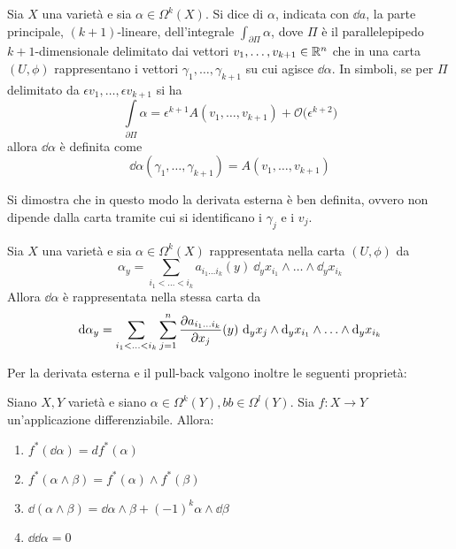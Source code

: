 \begin{definition}
  Sia $X$ una varietà e sia $\alpha \in \Omega^k(X)$. Si dice  di $\alpha$, indicata con $\dd{a}$, la parte principale, $(k+1)$-lineare, dell'integrale $\int_{\partial \Pi} \alpha$, dove $\Pi$ è il parallelepipedo $k+1$-dimensionale delimitato dai vettori $v_1, \ldots, v_{k+1} \in \mathbb{R}^{n}$ che in una carta $(U, \phi)$ rappresentano i vettori $\gamma_1, \ldots, \gamma_{k+1}$ su cui agisce $\dd\alpha$. In simboli, se per $\Pi$ delimitato da $\epsilon v_1, \ldots, \epsilon v_{k+1}$ si ha \begin{equation*}
    \int\limits_{\partial \Pi} \alpha = \epsilon^{k+1} A(v_1, \ldots, v_{k+1}) + \mathcal{O}\big(\epsilon^{k+2}\big)
  \end{equation*}
  allora $\dd\alpha$ è definita come \begin{equation*}
  \dd{\alpha}(\gamma_1, \ldots, \gamma_{k+1}) = A(v_1, \ldots, v_{k+1})
  \end{equation*} 
\end{definition}
\begin{remark}
  Si dimostra che in questo modo la derivata esterna è ben definita, ovvero non dipende dalla carta tramite cui si identificano i $\gamma_j$ e i $v_j$.
\end{remark}

\begin{theorem} \label{thm:derivCoords}
  Sia $X$ una varietà e sia $\alpha \in \Omega^k(X)$ rappresentata nella carta $(U, \phi)$ da \begin{equation*}
    \alpha_y = \sum_{i_1 < \ldots < i_k} a_{i_1\ldots i_k}(y)\ \dd_y x_{i_1} \wedge \ldots \wedge \dd_y x_{i_k}
    \end{equation*}
    Allora $\dd{\alpha}$ è rappresentata nella stessa carta da
    \begin{equation*}
      \dd{\alpha_y} = \sum_{i_1 < \ldots < i_k} \sum_{j=1}^n \pdv{a_{i_1\ldots i_k}}{x_j}()(y)\ \dd_y x_{j} \wedge \dd_y x_{i_1} \wedge \ldots \wedge \dd_y x_{i_k}
      \end{equation*}
\end{theorem}

Per la derivata esterna e il pull-back valgono inoltre le seguenti proprietà:
\begin{theorem}
  Siano $X,Y$ varietà e siano $\alpha \in \Omega^k(Y), bb \in \Omega^l(Y)$. Sia $f:X\to Y$ un'applicazione differenziabile. Allora:
  \begin{enumerate}
    \item $f^*(\dd{\alpha}) = df^*(\alpha)$
    \item $f^*(\alpha \wedge \beta) = f^*(\alpha) \wedge f^*(\beta)$
    \item $\dd (\alpha \wedge \beta) = \dd{\alpha} \wedge \beta + (-1)^k \alpha \wedge \dd{\beta}$
    \item $\dd{\dd{\alpha}} = 0$
  \end{enumerate}
\end{theorem}

